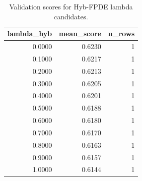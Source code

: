 \begin{table}[t]
\caption{Validation scores for Hyb-FPDE lambda candidates.}
\label{tab:lambda_distribution_computed}
\centering
\begin{tabular}{rrr}
\toprule
lambda\_hyb & mean\_score & n\_rows \\
\midrule
0.0000 & 0.6230 & 1 \\
0.1000 & 0.6217 & 1 \\
0.2000 & 0.6213 & 1 \\
0.3000 & 0.6205 & 1 \\
0.4000 & 0.6201 & 1 \\
0.5000 & 0.6188 & 1 \\
0.6000 & 0.6180 & 1 \\
0.7000 & 0.6170 & 1 \\
0.8000 & 0.6163 & 1 \\
0.9000 & 0.6157 & 1 \\
1.0000 & 0.6144 & 1 \\
\bottomrule
\end{tabular}

\end{table}
